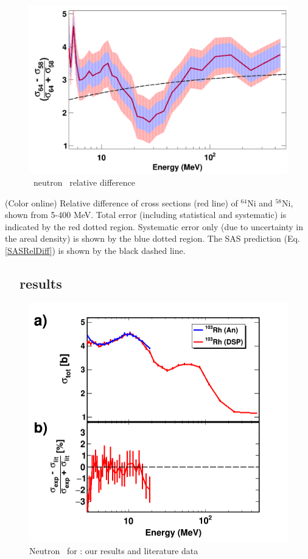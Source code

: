 \begin{figure}
    \includegraphics[scale=0.35]{figures/relativeDiff_Ni64Ni58.png}
    \caption{\niEightFour\ neutron \tot\ relative difference}
    \label{IsotopicDifferenceNi}
\end{figure}

(Color online) Relative difference of cross sections (red line) of
        $^{\text{64}}$Ni and $^{\text{58}}$Ni, shown from 5-400
        MeV. Total error
        (including statistical and systematic) is indicated by the red
        dotted region. Systematic error only (due to uncertainty in the areal
        density) is shown by the blue dotted region. The SAS prediction (Eq.
        \ref{SASRelDiff}) is shown by the black dashed line.

\subsection{\rhThree\ \tot\ results}
\begin{figure}
    \includegraphics[scale=0.35]{figures/TwoPanelRh.png}
    \caption{Neutron \tot\ for \rhThree: our results and literature data}
    \label{TwoPanelRh}
\end{figure}

